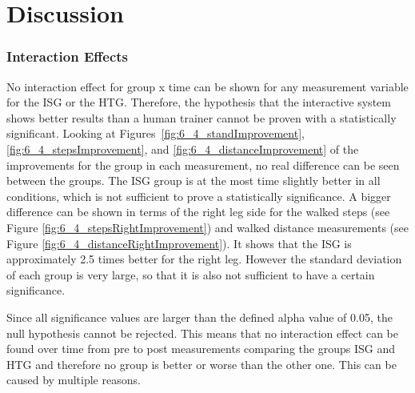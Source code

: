 \section{Discussion}\label{6_discussion}

\subsubsection{Interaction Effects}\label{6_5_interactionEffects}
No interaction effect for group x time can be shown for any measurement variable for the ISG or the HTG.
Therefore, the hypothesis that the interactive system shows better results than a human trainer cannot be proven with a statistically significant.
Looking at Figures~\ref{fig:6_4_standImprovement}, \ref{fig:6_4_stepsImprovement}, and \ref{fig:6_4_distanceImprovement} of the improvements for the group in each measurement, no real difference can be seen between the groups.
The ISG group is at the most time slightly better in all conditions, which is not sufficient to prove a statistically significance.
A bigger difference can be shown in terms of the right leg side for the walked steps (see Figure \ref{fig:6_4_stepsRightImprovement}) and walked distance measurements (see Figure \ref{fig:6_4_distanceRightImprovement}).
It shows that the ISG is approximately 2.5 times better for the right leg.
However the standard deviation of each group is very large, so that it is also not sufficient to have a certain significance.

Since all significance values are larger than the defined alpha value of 0.05, the null hypothesis cannot be rejected.
This means that no interaction effect can be found over time from pre to post measurements comparing the groups ISG and HTG and therefore no group is better or worse than the other one.
This can be caused by multiple reasons.

